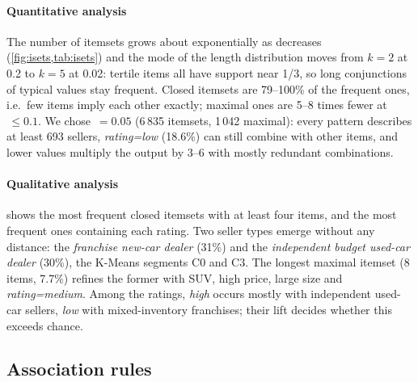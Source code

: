 \paragraph{Quantitative analysis} The number of itemsets grows about exponentially as  decreases (\cref{fig:isets,tab:isets}) and the mode of the length distribution moves from $k=2$ at 0.2 to $k=5$ at 0.02: tertile items all have support near 1/3, so long conjunctions of typical values stay frequent. Closed itemsets are 79--100\% of the frequent ones, i.e.\ few items imply each other exactly; maximal ones are 5--8 times fewer at $\,\leq0.1$. We chose \textbf{$\,=0.05$} (6\,835 itemsets, 1\,042 maximal): every pattern describes at least 693 sellers, \emph{rating=low} (18.6\%) can still combine with other items, and lower values multiply the output by 3--6 with mostly redundant combinations.

\paragraph{Qualitative analysis}  shows the most frequent closed itemsets with at least four items, and the most frequent ones containing each rating. Two seller types emerge without any distance: the \emph{franchise new-car dealer} (31\%) and the \emph{independent budget used-car dealer} (30\%), the K-Means segments C0 and C3. The longest maximal itemset (8 items, 7.7\%) refines the former with SUV, high price, large size and \emph{rating=medium}. Among the ratings, \emph{high} occurs mostly with independent used-car sellers, \emph{low} with mixed-inventory franchises; their lift decides whether this exceeds chance.

\begin{table}[t]
\centering
\caption{Most frequent closed itemsets with $k\geq4$ (top), and with a rating item and $k\geq3$ (bottom).}\label{tab:iset}
\end{table}

\subsection{Association rules}\label{sec:rules}
